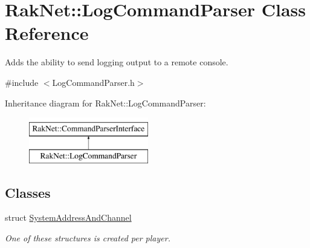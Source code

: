 \hypertarget{class_rak_net_1_1_log_command_parser}{\section{Rak\-Net\-:\-:Log\-Command\-Parser Class Reference}
\label{class_rak_net_1_1_log_command_parser}
}


Adds the ability to send logging output to a remote console.  




{\ttfamily \#include $<$Log\-Command\-Parser.\-h$>$}

Inheritance diagram for Rak\-Net\-:\-:Log\-Command\-Parser\-:\begin{figure}[H]
\begin{center}
\leavevmode
\includegraphics[height=2.000000cm]{class_rak_net_1_1_log_command_parser}
\end{center}
\end{figure}
\subsection*{Classes}
\begin{DoxyCompactItemize}
\item 
struct \hyperlink{struct_rak_net_1_1_log_command_parser_1_1_system_address_and_channel}{System\-Address\-And\-Channel}
\begin{DoxyCompactList}\small\item\em One of these structures is created per player. \end{DoxyCompactList}\end{DoxyCompactItemize}
